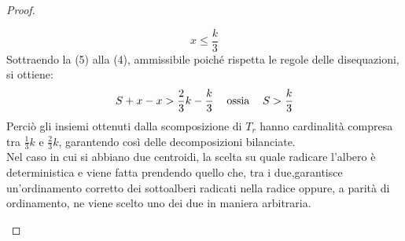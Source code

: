 \begin{proof}
\begin{itemize}
\begin{equation}
			x \le \frac{k}{3}
		\end{equation}
		Sottraendo la (5) alla (4), ammissibile poich\'e rispetta le regole delle disequazioni, si ottiene:\\
		\begin{equation}
			S + x - x > \frac{2}{3} k - \frac{k}{3} \hspace{0.3cm} \text{    ossia    }\hspace{0.3cm} S > \frac{k}{3}
		\end{equation}
		Perci\`o gli insiemi ottenuti dalla scomposizione di $T_r$ hanno cardinalit\`a compresa tra $\frac{1}{3} k$ e $\frac{2}{3} k$, garantendo cos\`i delle decomposizioni bilanciate.\\ 
		Nel caso in cui si abbiano due centroidi, la scelta su quale radicare l'albero  \`e deterministica e  viene fatta prendendo quello che, tra i due,garantisce un'ordinamento corretto dei sottoalberi radicati nella radice oppure, a parit\`a di ordinamento, ne viene scelto uno dei due in maniera arbitraria. 
	\end{itemize}
\end{proof}


